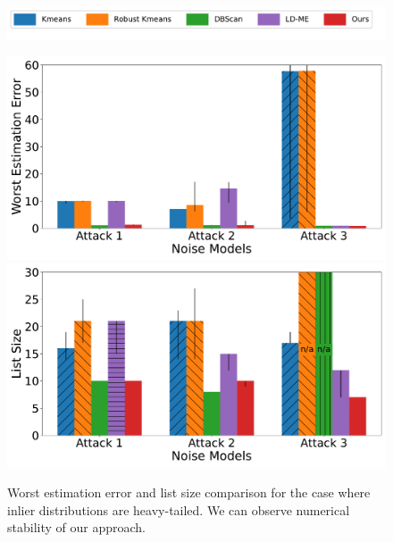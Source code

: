\begin{figure}[t]
    \centering
    \begin{minipage}[t]{0.8\linewidth}
        \includegraphics[width=0.99\linewidth]{chapters/robust/figures/new_legend.pdf}
        \end{minipage}
    \begin{minipage}[t]{\linewidth}
        \includegraphics[width=0.49\linewidth]{chapters/robust/figures/tdist_inliers_3_attacks_error.pdf}
        \includegraphics[width=0.49\linewidth]{chapters/robust/figures/tdist_inliers_3_attacks_size.pdf}
    \end{minipage}
    \caption{Worst estimation error and list size comparison for the case where inlier distributions are heavy-tailed. We can observe numerical stability of our approach.}
    \label{fig:heavy_tailed_results}
\end{figure}

